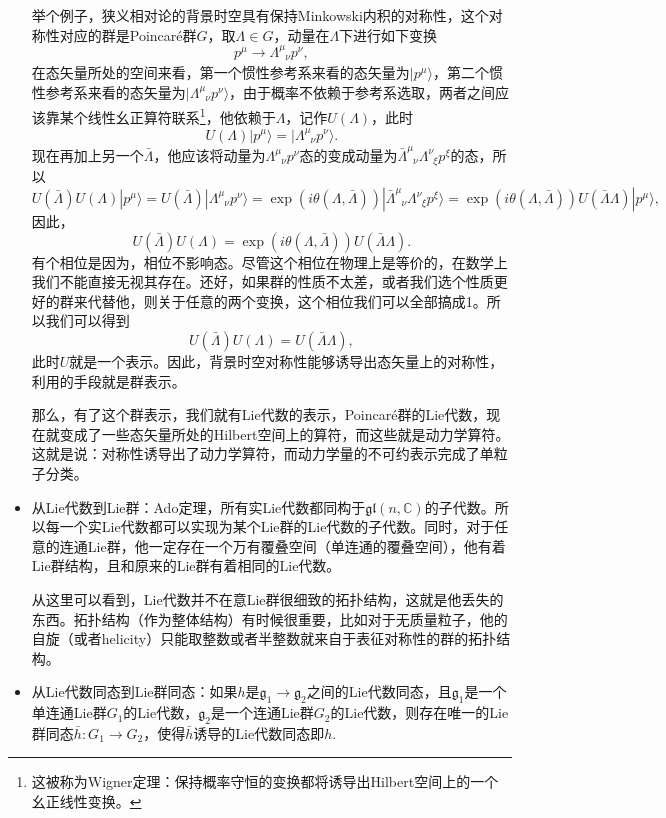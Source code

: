 \documentclass[9pt]{extarticle}
\newcommand{\cc}{\mathbb{C}}
\newcommand{\lag}{{\mathfrak{g}}}
\begin{document}
\begin{itemize}
举个例子，狭义相对论的背景时空具有保持Minkowski内积的对称性，这个对称性对应的群是Poincar\'e群$G$，取$\Lambda \in G$，动量在$\Lambda$下进行如下变换
\[
	p^\mu \to \Lambda^\mu_{\phantom{\mu}\nu}p^\nu,
\]
在态矢量所处的空间来看，第一个惯性参考系来看的态矢量为$|p^\mu\rangle$，第二个惯性参考系来看的态矢量为$|\Lambda^\mu_{\phantom{\mu}\nu}p^\nu\rangle$，由于概率不依赖于参考系选取，两者之间应该靠某个线性幺正算符联系\footnote{这被称为Wigner定理：保持概率守恒的变换都将诱导出Hilbert空间上的一个幺正线性变换。}，他依赖于$\Lambda$，记作$U(\Lambda)$，此时
\[
	U(\Lambda)|p^\mu\rangle = |\Lambda^\mu_{\phantom{\mu}\nu}p^\nu\rangle.
\]
现在再加上另一个$\bar\Lambda$，他应该将动量为$\Lambda^\mu_{\phantom{\mu}\nu}p^\nu$态的变成动量为$\bar{\Lambda}^\mu_{\phantom{\mu}\nu}\Lambda^\nu_{\phantom{\nu}\xi}p^\xi$的态，所以
\[
	U(\bar\Lambda)U(\Lambda)|p^\mu\rangle = U(\bar\Lambda)|\Lambda^\mu_{\phantom{\mu}\nu}p^\nu\rangle = \exp(i\theta(\Lambda,\bar\Lambda))|\bar{\Lambda}^\mu_{\phantom{\mu}\nu}\Lambda^\nu_{\phantom{\nu}\xi}p^\xi\rangle = \exp(i\theta(\Lambda,\bar\Lambda))U(\bar\Lambda \Lambda)|p^\mu\rangle,
\]
因此，
\[
	U(\bar\Lambda)U(\Lambda)= \exp(i\theta(\Lambda,\bar\Lambda)) U(\bar\Lambda \Lambda).
\]
有个相位是因为，相位不影响态。尽管这个相位在物理上是等价的，在数学上我们不能直接无视其存在。还好，如果群的性质不太差，或者我们选个性质更好的群来代替他，则关于任意的两个变换，这个相位我们可以全部搞成1。所以我们可以得到
\[
	U(\bar\Lambda)U(\Lambda) = U(\bar\Lambda \Lambda),
\]
此时$U$就是一个表示。因此，背景时空对称性能够诱导出态矢量上的对称性，利用的手段就是群表示。

那么，有了这个群表示，我们就有Lie代数的表示，Poincar\'e群的Lie代数，现在就变成了一些态矢量所处的Hilbert空间上的算符，而这些就是动力学算符。这就是说：对称性诱导出了动力学算符，而动力学量的不可约表示完成了单粒子分类。

\item 从Lie代数到Lie群：Ado定理，所有实Lie代数都同构于$\mathfrak{gl}(n,\cc)$的子代数。所以每一个实Lie代数都可以实现为某个Lie群的Lie代数的子代数。同时，对于任意的连通Lie群，他一定存在一个万有覆叠空间（单连通的覆叠空间），他有着Lie群结构，且和原来的Lie群有着相同的Lie代数。

从这里可以看到，Lie代数并不在意Lie群很细致的拓扑结构，这就是他丢失的东西。拓扑结构（作为整体结构）有时候很重要，比如对于无质量粒子，他的自旋（或者helicity）只能取整数或者半整数就来自于表征对称性的群的拓扑结构。

\item 从Lie代数同态到Lie群同态：如果$h$是$\lag_1\to \lag_2$之间的Lie代数同态，且$\lag_1$是一个单连通Lie群$G_1$的Lie代数，$\lag_2$是一个连通Lie群$G_2$的Lie代数，则存在唯一的Lie群同态$\bar{h}:G_1\to G_2$，使得$\bar{h}$诱导的Lie代数同态即$h$.


\end{itemize}
\end{document}
